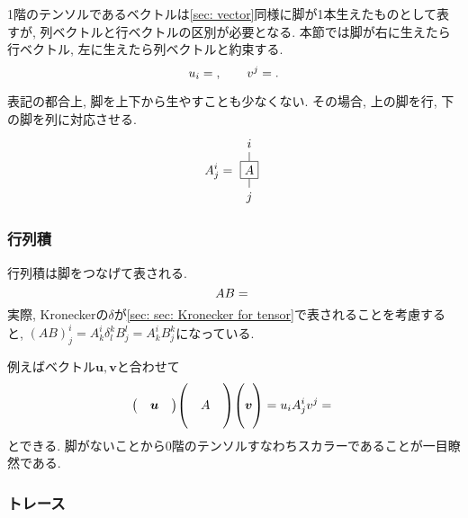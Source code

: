 \documentclass[dvipdfmx]{jsarticle}
\begin{document}
1階のテンソルであるベクトルは\ref{sec: vector}同様に脚が1本生えたものとして表すが, 列ベクトルと行ベクトルの区別が必要となる.
本節では脚が右に生えたら行ベクトル, 左に生えたら列ベクトルと約束する.
\begin{equation*}
    u_i=
    \vcenter{\hbox{}}
    ,\qquad
    v^j
    =
    \vcenter{\hbox{}}
    .
\end{equation*}

表記の都合上, 脚を上下から生やすことも少なくない.
その場合, 上の脚を行, 下の脚を列に対応させる.
\begin{equation*}
    A^i_j
    =
    \vcenter{\hbox{
        \begin{tikzpicture}
            \node at(0,0)[anchor=center, draw, rectangle](A){$A$};
            \draw
                (A.north)--++(0,.25)
                node[anchor=south]{$i$}
                (A.south)--++(0,-.25)
                node[anchor=north]{$j$}
            ;
        \end{tikzpicture}
    }}
\end{equation*}


\subsubsection{行列積}

行列積は脚をつなげて表される.
\begin{equation*}
    AB
    =
    \vcenter{\hbox{}}
\end{equation*}
実際, Kroneckerの$\delta$が\ref{sec: sec: Kronecker for tensor}で表されることを考慮すると, $(AB)^i_j=A^i_k\delta^k_lB^l_j=A^i_kB^k_j$になっている.

例えばベクトル$\bm{u},\bm{v}$と合わせて
\begin{equation*}
    \mqty(&\bm{u}&)
    \mqty(&&\\ &A&\\ &&)
    \mqty( {} \\ \bm{v} \\ {} )
    =
    u_iA^i_jv^j
    =
    \vcenter{\hbox{}}
\end{equation*}
とできる.
脚がないことから0階のテンソルすなわちスカラーであることが一目瞭然である.


\subsubsection{トレース}
\end{document}
